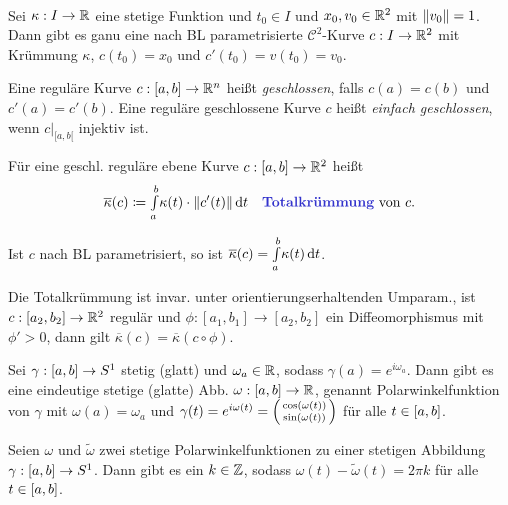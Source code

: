 \documentclass{cheat-sheet}
\newcommand{\Intabdt}[1]{\Int{a}{b}{#1}{t}}
\newcommand{\Cont}{\mathcal{C}} %
\begin{document}
\begin{satz}\mbox{}\\
  Sei $\kappa : I \to \mathbb{R}$ eine stetige Funktion und $t_0 \in I$ und $x_0, v_0 \in \mathbb{R}^2$ mit $\lVert v_0\rVert = 1$. Dann gibt es ganu eine nach BL parametrisierte $\Cont^2$-Kurve $c : I \to \mathbb{R}^2$ mit Krümmung $\kappa$, $c(t_0) = x_0$ und $c'(t_0) = v(t_0) = v_0$.
\end{satz}

\begin{defn}
  Eine reguläre Kurve $c : \left[ a, b \right] \to \mathbb{R}^n$ heißt \emph{geschlossen}, falls $c(a) = c(b)$ und $c'(a) = c'(b)$.
  Eine reguläre geschlossene Kurve $c$ heißt \emph{einfach geschlossen}, wenn $c|_{[a, b[}$ injektiv ist.
\end{defn}

\begin{defn}
  Für eine geschl. reguläre ebene Kurve $c : \left[ a, b \right] \to \mathbb{R}^2$ heißt
  \[
    \overline{\kappa}(c) \coloneqq \Intabdt{\kappa(t) \cdot \norm{c'(t)}}
    \quad \text{\emph{Totalkrümmung} von $c$.}
  \]
\end{defn}

\begin{bem}
  Ist $c$ nach BL parametrisiert, so ist $\overline{\kappa}(c) = \Intabdt{\kappa(t)}$.
\end{bem}

\begin{satz}
  Die Totalkrümmung ist invar. unter orientierungserhaltenden Umparam., \dh{} ist $c : [a_2, b_2] \to \mathbb{R}^2$ regulär und $\phi : [a_1, b_1] \to [a_2, b_2]$ ein Diffeomorphismus mit $\phi' > 0$, dann gilt $\overline\kappa(c) = \overline\kappa(c \circ \phi)$.
\end{satz}

\begin{satz}
  Sei $\gamma : \left[ a, b \right] \to S^1$ stetig (glatt) und $\omega_a \in \mathbb{R}$, sodass $\gamma(a) = e^{i \omega_a}$. Dann gibt es eine eindeutige stetige (glatte) Abb. $\omega : \left[ a, b \right] \to \mathbb{R}$, genannt Polarwinkelfunktion von $\gamma$ mit $\omega(a) = \omega_a$ und $\gamma(t) = e^{i \omega(t)} = \begin{psmallmatrix} \cos(\omega(t)) \\ \sin(\omega(t)) \end{psmallmatrix}$ für alle $t \in \left[ a, b \right]$.
\end{satz}

\begin{satz}
  Seien $\omega$ und $\tilde\omega$ zwei stetige Polarwinkelfunktionen zu einer stetigen Abbildung $\gamma : \left[ a, b \right] \to S^1$. Dann gibt es ein $k \in \mathbb{Z}$, sodass $\omega(t) - \tilde\omega(t) = 2 \pi k$ für alle $t \in \left[ a, b \right]$.
\end{satz}
\end{document}
